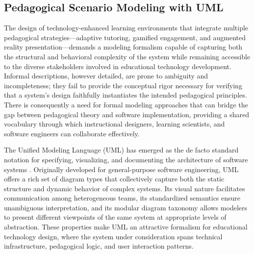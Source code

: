 \subsection{Pedagogical Scenario Modeling with UML}
\label{subsec:uml}

The design of technology-enhanced learning environments that integrate multiple pedagogical strategies---adaptive tutoring, gamified engagement, and augmented reality presentation---demands a modeling formalism capable of capturing both the structural and behavioral complexity of the system while remaining accessible to the diverse stakeholders involved in educational technology development. Informal descriptions, however detailed, are prone to ambiguity and incompleteness; they fail to provide the conceptual rigor necessary for verifying that a system's design faithfully instantiates the intended pedagogical principles. There is consequently a need for formal modeling approaches that can bridge the gap between pedagogical theory and software implementation, providing a shared vocabulary through which instructional designers, learning scientists, and software engineers can collaborate effectively.

The Unified Modeling Language (UML) has emerged as the de facto standard notation for specifying, visualizing, and documenting the architecture of software systems \cite{Booch2005, Rumbaugh2004}. Originally developed for general-purpose software engineering, UML offers a rich set of diagram types that collectively capture both the static structure and dynamic behavior of complex systems. Its visual nature facilitates communication among heterogeneous teams, its standardized semantics ensure unambiguous interpretation, and its modular diagram taxonomy allows modelers to present different viewpoints of the same system at appropriate levels of abstraction. These properties make UML an attractive formalism for educational technology design, where the system under consideration spans technical infrastructure, pedagogical logic, and user interaction patterns.

